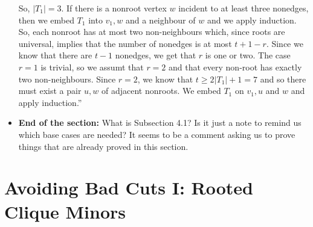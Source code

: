 \documentclass[11 pt]{article}
\begin{document}
\begin{itemize}
So, $|T_1|=3$. If there is a nonroot vertex $w$ incident to at least three nonedges, then we embed $T_1$ into $v_1,w$ and a neighbour of $w$ and we apply induction. So, each nonroot has at most two non-neighbours which, since roots are universal, implies that the number of nonedges is at most $t+1-r$. Since we know that there are $t-1$ nonedges, we get that $r$ is one or two. The case $r=1$ is trivial, so we assumt that $r=2$ and that every non-root has exactly two non-neighbours. Since $r=2$, we know that $t\geq 2|T_1|+1 = 7$ and so there must exist a pair $u,w$ of adjacent nonroots. We embed $T_1$ on $v_1,u$ and $w$ and apply induction.''

\item \textbf{End of the section:} What is Subsection 4.1? Is it just a note to remind us which base cases are needed? It seems to be a comment asking us to prove things that are already proved in this section.  
\end{itemize}

\section{Avoiding Bad Cuts I: Rooted Clique Minors}
\end{document}
